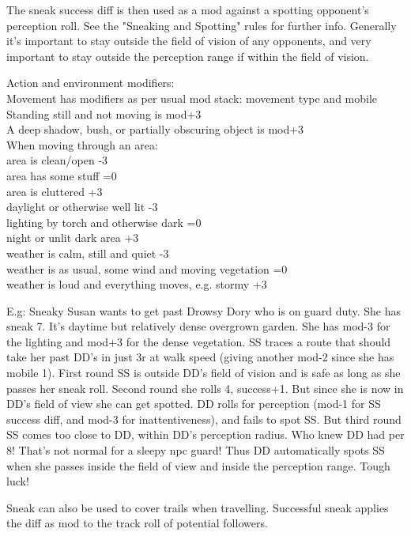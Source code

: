 The sneak success diff is then used as a mod against a spotting opponent's perception roll. See the "Sneaking and Spotting" rules for further info.
Generally it's important to stay outside the field of vision of any opponents, and very important to stay outside the perception range if within the field of vision.

Action and environment modifiers:\\
Movement has modifiers as per usual mod stack: movement type and mobile\\
Standing still and not moving is mod+3\\
A deep shadow, bush, or partially obscuring object is mod+3\\

When moving through an area:\\
area is clean/open -3\\
area has some stuff =0\\
area is cluttered +3\\
daylight or otherwise well lit -3\\
lighting by torch and otherwise dark =0\\
night or unlit dark area +3\\
weather is calm, still and quiet -3\\
weather is as usual, some wind and moving vegetation =0\\
weather is loud and everything moves, e.g. stormy  +3

E.g: Sneaky Susan wants to get past Drowsy Dory who is on guard duty. She has sneak 7. It's daytime but relatively dense overgrown garden. She has mod-3 for the lighting and mod+3 for the dense vegetation. SS traces a route that should take her past DD's in just 3r at walk speed (giving another mod-2 since she has mobile 1). First round SS is outside DD's field of vision and is safe as long as she passes her sneak roll. Second round she rolls 4, success+1. But since she is now in DD's field of view she can get spotted. DD rolls for perception (mod-1 for SS success diff, and mod-3 for inattentiveness), and fails to spot SS. But third round SS comes too close to DD, within DD's perception radius. Who knew DD had per 8! That's not normal for a sleepy npc guard! Thus DD automatically spots SS when she passes inside the field of view and inside the perception range. Tough luck!

Sneak can also be used to cover trails when travelling. Successful sneak applies the diff as mod to the track roll of potential followers.

